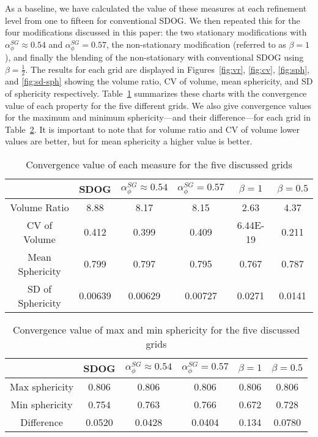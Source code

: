 As a baseline, we have calculated the value of these measures at each refinement level from one to fifteen for conventional SDOG.
We then repeated this for the four modifications discussed in this paper: the two stationary modifications with $\alpha_{\phi}^{SG} \approx 0.54$ and $\alpha_{\phi}^{SG} = 0.57$, the non-stationary modification (referred to as $\beta = 1$), and finally the blending of the non-stationary with conventional SDOG using $\beta = \frac{1}{2}$.
The results for each grid are displayed in Figures~\ref{fig:vr}, \ref{fig:cv}, \ref{fig:sph}, and \ref{fig:sd-sph} showing the volume ratio, CV of volume, mean sphericity, and SD of sphericity respectively.
Table~\ref{tab:results} summarizes these charts with the convergence value of each property for the five different grids.
We also give convergence values for the maximum and minimum sphericity---and their difference---for each grid in Table~\ref{tab:results-sph}.
It is important to note that for volume ratio and CV of volume lower values are better, but for mean sphericity a higher value is better.


\begin{table}[]
	\centering
	\caption[Title]{
		Convergence value of each measure for the five discussed grids
	}
	\begin{tabular}{|c|c|c|c|c|c|}
		\hline
		& SDOG & $\alpha_{\phi}^{SG} \approx 0.54$ & $\alpha_{\phi}^{SG} = 0.57$ & $\beta = 1$ & $\beta = 0.5$ \\ \hline
		Volume Ratio     & 8.88   & 8.17   & 8.15   & 2.63      & 4.37   \\ \hline
		CV of Volume     & 0.412  & 0.399  & 0.409  & 6.44E-19  & 0.211  \\ \hline
		Mean Sphericity  & 0.799  & 0.797  & 0.795  & 0.767     & 0.787  \\ \hline
		SD of Sphericity & 0.00639& 0.00629& 0.00727& 0.0271    & 0.0141 \\ \hline
	\end{tabular}
	\label{tab:results}
\end{table}


\begin{table}[]
	\centering
	\caption[Title]{
		Convergence value of max and min sphericity for the five discussed grids
	}
	\begin{tabular}{|c|c|c|c|c|c|}
		\hline
		& SDOG & $\alpha_{\phi}^{SG} \approx 0.54$ & $\alpha_{\phi}^{SG} = 0.57$ & $\beta = 1$ & $\beta = 0.5$ \\ \hline
		Max sphericity & 0.806  & 0.806  & 0.806  & 0.806 & 0.806  \\ \hline
		Min sphericity & 0.754  & 0.763  & 0.766  & 0.672 & 0.728  \\ \hline
		Difference     & 0.0520 & 0.0428 & 0.0404 & 0.134 & 0.0780 \\ \hline
	\end{tabular}
	\label{tab:results-sph}
\end{table}


